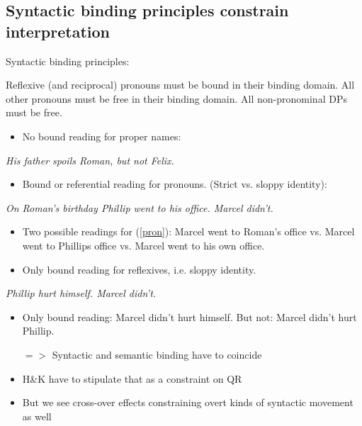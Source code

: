 \documentclass[a4paper]{article}
\begin{document}
\subsection{Syntactic binding principles constrain interpretation}

\begin{exe}
	\ex Syntactic binding principles:
	\begin{xlist}
		\ex Reflexive (and reciprocal) pronouns must be bound in their binding domain.
		\ex All other pronouns must be free in their binding domain.
		\ex All non-pronominal DPs must be free.
	\end{xlist}
\end{exe}

\begin{itemize}
	\item No bound reading for proper names:
\end{itemize}

\begin{exe}
	\ex \emph{His father spoils Roman, but not Felix.}
\end{exe}

\begin{itemize}
	\item Bound or referential reading for pronouns. (Strict vs. sloppy identity):
\end{itemize}

\begin{exe}
	\ex \label{pron} \emph{On Roman's birthday Phillip went to his office. Marcel didn't.}
\end{exe}

\begin{itemize}
	\item Two possible readings for (\ref{pron}): Marcel went to Roman's office vs. Marcel went to Phillips office vs. Marcel went to his own office.
	\item Only bound reading for reflexives, i.e. sloppy identity.
\end{itemize}

\begin{exe}
	\ex \emph{Phillip hurt himself. Marcel didn't.}
\end{exe}
\begin{itemize}
	\item Only bound reading: Marcel didn't hurt himself. But not: Marcel didn't hurt Phillip.
	\item[$=>$] Syntactic and semantic binding have to coincide
	\item H\&K have to stipulate that as a constraint on QR
	\item But we see cross-over effects constraining overt kinds of syntactic movement as well
\end{itemize}
\end{document}
